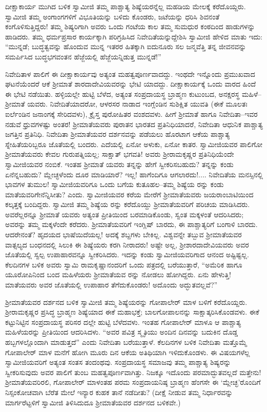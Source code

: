ದೀಕ್ಷಾಕಾರ್ಯ ಮುಗಿದ ಬಳಿಕ ಸ್ವಾಮೀಜಿ ತಮ್ಮ ಪಾಶ್ಚಾತ್ಯ ಶಿಷ್ಯೆಯರನ್ನೆಲ್ಲ ಮಹಡಿಯ ಮೇಲಕ್ಕೆ ಕರೆದೊಯ್ದರು. ಸ್ವಾಮೀಜಿ ತಮ್ಮ ಅಂಗಾಂಗಗಳಿಗೆ ವಿಭೂತಿಯನ್ನು ಬಳಿದು ಕೊಂಡರು, ಜಟೆಯನ್ನು ಧರಿಸಿ ಶಿವನಂತೆ ಕಂಗೊಳಿಸುತ್ತಿದ್ದರು! ತಮ್ಮ ಶಿಷ್ಯರಿಗಾಗಿ ಅವರು ಒಂದು ಗಂಟೆಯ ಕಾಲ ತಮ್ಮ ಸುಮಧುರ ಕಂಠದಿಂದ ಹಾಡುಗಳನ್ನು ಹಾಡಿದರು. ತಮ್ಮ ಧರ್ಮಪ್ರಸಾರ ಕಾರ್ಯಕ್ಕಾಗಿ ಪರಿಗ್ರಹಿಸಿದ ನಿವೇದಿತೆಯನ್ನುದ್ದೇಶಿಸಿ ಸ್ವಾಮೀಜಿ ಹೇಳಿದ ಮಾತು ಇದು: “ಮುನ್ನಡೆ; ಬುದ್ಧತ್ವವನ್ನು ಹೊಂದುವ ಮುನ್ನ ಇತರರ ಹಿತಕ್ಕಾಗಿ ಐದುನೂರು ಸಲ ಜನ್ಮವೆತ್ತಿ ತನ್ನ ಜೀವನವನ್ನು ಸಮರ್ಪಿಸಿದ ಬುದ್ಧಭಗವಂತನ ಹೆಜ್ಜೆಯಲ್ಲಿ ಹೆಜ್ಜೆಯನ್ನಿಡುತ್ತ ಮುನ್ನಡೆ!”

ನಿವೇದಿತಾಳ ಪಾಲಿಗೆ ಈ ದೀಕ್ಷಾಕಾರ್ಯವು ಅತ್ಯಂತ ಮಹತ್ವಪೂರ್ಣವಾದದ್ದು. ಇಂಥದೇ ಇನ್ನೊಂದು ಪ್ರಮುಖವಾದ ಘಟನೆಯೆಂದರೆ ಆಕೆ ಶ್ರೀಮಾತೆ ಶಾರದಾದೇವಿಯವರನ್ನು ಭೇಟಿ ಯಾದದ್ದು. ದೀಕ್ಷಾಕಾರ್ಯಕ್ಕೆ ಒಂದು ವಾರದ ಹಿಂದೆ ಈ ಭೇಟಿ ನಡೆಯಿತು. ಹಳ್ಳಿಯಲ್ಲೇ ಹುಟ್ಟಿ ಬೆಳೆದ, ಅತ್ಯಂತ ಸಂಪ್ರದಾಯಸ್ಥ ಬ್ರಾಹ್ಮಣ ಕುಟುಂಬದ, ಅನಕ್ಷರಸ್ಥ ಮಹಿಳೆ–ಶ್ರೀಮಾತೆ ಯವರು. ನಿವೇದಿತೆಯಾದರೋ, ಆಳರಸರ ನಾಡಾದ ಇಂಗ್ಲೆಂಡಿನ ಸುಶಿಕ್ಷಿತ ಯುವತಿ (ಈಕೆ ಮೂಲತಃ ಐರ್ಲೆಂಡಿನ ಜನಾಂಗಕ್ಕೆ ಸೇರಿದವಳು), ಕ್ರೈಸ್ತ ಪುರೋಹಿತರ ವಂಶದವಳು. ಹೀಗೆ ಶ್ರೀಮಾತೆ ಹಾಗೂ ನಿವೇದಿತಾ–ಇವರ ನಡುವೆ ಧ್ರುವಗಳಷ್ಟು ಅಂತರ! ಶ್ರೀಮಾತೆಯವರು ಪುರಾತನ ಭಾರತದ ಪ್ರತಿನಿಧಿಯಾದರೆ, ನಿವೇದಿತಾ ಆಧುನಿಕ ಪಾಶ್ಚಾತ್ಯ ಜಗತ್ತಿನ ಪ್ರತಿನಿಧಿ. ನಿವೇದಿತಾ ಶ್ರೀಮಾತೆಯವರ ದರ್ಶನವನ್ನು ಪಡೆಯಲು ಹೊರಟಾಗ ಆಕೆಯ ಪಾಶ್ಚಾತ್ಯ ಸ್ನೇಹಿತೆಯರಿಬ್ಬರೂ ಜೊತೆಯಲ್ಲಿ ಬಂದರು. ಎದೆಯಲ್ಲಿ ಏನೋ ಅಳುಕು, ಏನೋ ಕಾತರ. ಸ್ವಾಮೀಜಿಯವರ ಪಾಲಿಗೋ ಶ್ರೀಮಾತೆಯವರು ಕೇವಲ ಗುರುಪತ್ನಿಯಲ್ಲ; ಸಾಕ್ಷಾತ್ ಭಗವತಿ! ಅವರು ಶ್ರೀರಾಮಕೃಷ್ಣರ ಪ್ರತಿನಿಧಿಯೆಂದೇ ಸ್ವಾಮೀಜಿಯವರ ನಂಬಿಕೆ. ಇಂತಹ ಶ್ರೀಮಾತೆ ಯವರು ತನ್ನನ್ನು ಹೇಗೆ ಸ್ವೀಕರಿಸಬಹುದು? ತನ್ನನ್ನು ಕಂಡು ಏನೆನ್ನಬಹುದು? ಮ್ಲೇಚ್ಛಳೆಂದು ದೂರ ಮಾಡಿಯಾರೆ? ಇಲ್ಲ! ಹಾಗೆಂದಿಗೂ ಆಗಲಾರದು!.... ನಿವೇದಿತೆಯ ಮನಸ್ಸಿನಲ್ಲಿ ಭಾವಗಳ ತುಮುಲ! ಸ್ವಾಮೀಜಿಯವರಿಗೂ ಒಂದು ಬಗೆಯ ಕುತೂಹಲ–ತಮ್ಮ ಶಿಷ್ಯೆಯ ರನ್ನು ಕಂಡು ಮಾತೆಯವರಿಗೇನೆನ್ನಿಸೀತು? ಎಂದು. ಸ್ವಾಮೀಜಿಯವರ ಕರೆಯ ಮೇರೆಗೆ ಶ್ರೀಮಾತೆಯವರು ಜಯರಾಂಬಾಟಿಯಿಂದ ಕಲ್ಕತ್ತಕ್ಕೆ ಬಂದಿದ್ದರು. ಸ್ವಾಮೀಜಿ ತಮ್ಮ ಶಿಷ್ಯೆಯ ರನ್ನು ಕರೆದೊಯ್ದು ಶ್ರೀಮಾತೆಯವರಿಗೆ ಪರಿಚಯ ಮಾಡಿಸಿದರು. ಅವರೆಲ್ಲರನ್ನೂ ಶ್ರೀಮಾತೆ ಯವರು ಅತ್ಯಂತ ಪ್ರೀತಿಯಿಂದ ಬರಮಾಡಿಕೊಂಡು, ಸ್ವಂತ ಮಕ್ಕಳಂತೆ ಆದರಿಸಿದರು; ಅವರನ್ನು ತಮ್ಮ ಮಕ್ಕಳೆಂದೇ ಕರೆದರು. ಶ್ರೀಮಾತೆಯವರಿಗೆ ಇಂಗ್ಲಿಷ್ ಬಾರದು, ಈ ಪಾಶ್ಚಾತ್ಯರಿಗೆ ಬಂಗಾಳಿ ಬಾರದು. ಆದರೇನಂತೆ? ಹೃದಯದ ಭಾಷೆಯಿದೆಯಲ್ಲ! ಅದಕ್ಕೆ ಶಬ್ದಗಳು ಬೇಕಿಲ್ಲ. ವಿಶ್ವವನ್ನೇ ತಬ್ಬುವ ಶ್ರೀಮಾತೆಯವರ ವಾತ್ಸಲ್ಯದ ಬಂಧನದಲ್ಲಿ ಸಿಲುಕಿ ಈ ಶಿಷ್ಯೆಯರು ಕರಗಿ ನೀರಾದರು! ಅಷ್ಟೇ ಅಲ್ಲ, ಶ್ರೀಶಾರದಾದೇವಿಯವರು ಅವರ ಜೊತೆಯಲ್ಲಿ ಸ್ವಲ್ಪ ಉಪಾಹಾರವನ್ನೂ ಸ್ವೀಕರಿಸಿದರು. ಇದನ್ನು ಕಂಡು ಸ್ವಾಮೀಜಿಯವರಿಗಾದ ಆನಂದ ಅಷ್ಟಿಷ್ಟಲ್ಲ. ಕೆಲದಿನಗಳ ಬಳಿಕ ಅವರು ಸ್ವಾಮಿ ರಾಮಕೃಷ್ಣಾನಂದರಿಗೆ ಒಂದು ಪತ್ರದಲ್ಲಿ ಬರೆಯುತ್ತಾರೆ, “ಅಮೆರಿಕ ಹಾಗೂ ಯೂರೋಪಿನಿಂದ ಬಂದ ಮಹಿಳೆಯರು ಶ್ರೀಮಾತೆಯವ ರನ್ನು ನೋಡಲು ಹೋಗಿದ್ದರು. ಏನು ಹೇಳುತ್ತಿ! ಮಾತೆಯವರು ಅವರ ಜೊತೆಯಲ್ಲಿ ಉಪಾಹಾರ ತೆಗೆದುಕೊಂಡರು! ಅದೊಂದು ಅದ್ಭುತವಲ್ಲವೆ?”

ಶ್ರೀಮಾತೆಯವರ ದರ್ಶನದ ಬಳಿಕ ಸ್ವಾಮೀಜಿ ತಮ್ಮ ಶಿಷ್ಯೆಯರನ್ನು ಗೋಪಾಲೇರ್ ಮಾಳ ಬಳಿಗೆ ಕರೆದೊಯ್ದರು. ಶ್ರೀರಾಮಕೃಷ್ಣರ ಪ್ರಸಿದ್ಧ ಬ್ರಾಹ್ಮಣ ಶಿಷ್ಯೆಯಾದ ಈಕೆ ಮಹಾಭಕ್ತೆ; ಬಾಲಗೋಪಾಲನನ್ನು ಸಾಕ್ಷಾತ್ಕರಿಸಿಕೊಂಡವಳು. ಈಕೆ ಕಟ್ಟುನಿಟ್ಟಿನ ಸಂಪ್ರದಾಯಸ್ಥ ಪರಿಸರ ದಲ್ಲೇ ಹುಟ್ಟಿ ಬೆಳೆದವಳು. ಇಂತಹ ಗೋಪಾಲೇರ್ ಮಾಳೂ ಆ ಪಾಶ್ಚಾತ್ಯ ಮಹಿಳೆಯರನ್ನು ಪ್ರೀತಿಯಿಂದ ಆದರಿಸಿದಳು. “ಅವರ ಪವಿತ್ರ ಸ್ಮೃತಿಯು ಅಂದಿನ ದಿನವನ್ನು ಬದುಕಿನ ದೊಡ್ಡ ಹಬ್ಬಗಳಲ್ಲೊಂದಾಗಿ ಮಾಡುತ್ತದೆ” ಎಂದು ನಿವೇದಿತಾ ಬರೆಯುತ್ತಾಳೆ. ಕೆಲದಿನಗಳ ಬಳಿಕ ನಿವೇದಿತಾ ಮತ್ತೊಮ್ಮೆ ಗೋಪಾಲೇರ್ ಮಾಳ ಮನೆಗೆ ಹೋಗಿ ಮೂರು ದಿನ ಆಕೆಯ ಅತಿಥಿಯಾಗಿ ಇಳಿದುಕೊಂಡಳು. ಈ ವಿಷಯಗಳೆಲ್ಲ ಸ್ವಾಮೀಜಿಯವರಿಗೆ ಅತ್ಯಂತ ಸಂತಸ ತಂದಂಥವು. ಸಂಪ್ರದಾಯಸ್ಥ ಸಮಾಜವು ತಮ್ಮ ಪಾಶ್ಚಾತ್ಯ ಶಿಷ್ಯರನ್ನು ಸ್ವೀಕರಿಸುವುದು ಅವರ ಪಾಲಿಗೆ ತುಂಬ ಮಹತ್ವಪೂರ್ಣವಾಗಿತ್ತು. ನಿಜಕ್ಕೂ ಇದೊಂದು ಪರಮಾದ್ಭುತವಲ್ಲದೆ ಮತ್ತೇನು! ಶ್ರೀಮಾತೆಯವರಿರಲಿ, ಗೋಪಾಲೇರ್ ಮಾಳಂತಹ ಪರಮ ಸಂಪ್ರದಾಯನಿಷ್ಠ ಬ್ರಾಹ್ಮಣ ಹೆಂಗಸೇ ಈ ‘ಮ್ಲೇಚ್ಛ’ರೊಂದಿಗೆ ನಿಸ್ಸಂಕೋಚವಾಗಿ ಬೆರೆತ ಮೇಲೆ ಇನ್ಯಾರ ಕುಹಕ ತಾನೆ ನಡೆದೀತು? (ದೀಕ್ಷೆ ನೀಡುವ ತಮ್ಮ ನಿರ್ಧಾರವನ್ನು ಮಾರ್ಗರೆಟ್ಟಳಿಗೆ ಸ್ವಾಮೀಜಿ ತಿಳಿಸಿದುದೂ ಶ್ರೀಮಾತೆಯವರ ದರ್ಶನದ ಬಳಿಕವೇ.)

